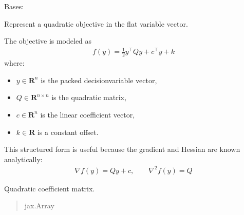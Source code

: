\documentclass[letterpaper,10pt,english,openany,oneside]{sphinxmanual}
\begin{document}
\begin{fulllineitems}

\pysigstartsignatures
{}
\pysigstopsignatures
\sphinxAtStartPar
Bases: 

\sphinxAtStartPar
Represent a quadratic objective in the flat variable vector.

\sphinxAtStartPar
The objective is modeled as
\begin{equation*}
\begin{split}f(y) = \frac{1}{2} y^\top Q y + c^\top y + k\end{split}
\end{equation*}
\sphinxAtStartPar
where:
\begin{itemize}
\item {} 
\sphinxAtStartPar
\(y \in \mathbf{R}^n\) is the packed decision\sphinxhyphen{}variable vector,

\item {} 
\sphinxAtStartPar
\(Q \in \mathbf{R}^{n \times n}\) is the quadratic matrix,

\item {} 
\sphinxAtStartPar
\(c \in \mathbf{R}^n\) is the linear coefficient vector,

\item {} 
\sphinxAtStartPar
\(k \in \mathbf{R}\) is a constant offset.

\end{itemize}

\sphinxAtStartPar
This structured form is useful because the gradient and Hessian are known
analytically:
\begin{equation*}
\begin{split}\nabla f(y) = Q y + c,\qquad \nabla^2 f(y) = Q\end{split}
\end{equation*}

\begin{fulllineitems}

\pysigstartsignatures
{}
\pysigstopsignatures
\sphinxAtStartPar
Quadratic coefficient matrix.
\begin{quote}\begin{description}
\sphinxAtStartPar
jax.Array


\end{description}
\end{quote}
\end{fulllineitems}
\end{fulllineitems}
\end{document}
